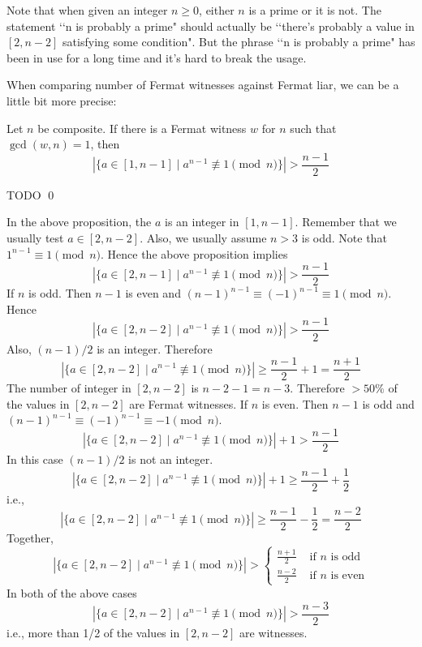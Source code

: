 Note that when given an integer $n \geq 0$, either $n$ is a prime
or it is not.
The statement \lq\lq n is probably a prime" should actually be
\lq\lq there's probably a value in $[2, n-2]$
satisfying some condition".
But the phrase \lq\lq n is probably a prime" has been in use for a long
time and it's hard to break the usage.

When comparing number of Fermat witnesses against Fermat liar,
we can be a little bit more precise:

\begin{prop}
  Let $n$ be composite.
  If there is a Fermat witness $w$ for $n$ such that $\gcd(w, n) = 1$, then
  \[
  |\{a \in [1, n - 1] \mid a^{n-1} \not\equiv 1 \pmod{n} \}| > \frac{n - 1}{2}
  \]
\end{prop}
\proof
TODO
\qed


In the above proposition, the $a$ is an integer in $[1, n - 1]$.
Remember that we usually test $a \in [2, n-2]$.
Also, we usually assume $n > 3$ is odd.
Note that $1^{n-1} \equiv 1 \pmod{n}$.
Hence the above proposition implies
\[
|\{a \in [2, n - 1] \mid a^{n-1} \not\equiv 1 \pmod{n} \}| > \frac{n - 1}{2}
\]
If $n$ is odd.
Then $n - 1$ is even and $(n-1)^{n-1} \equiv (-1)^{n-1} \equiv 1 \pmod{n}$.
Hence
\[
|\{a \in [2, n - 2] \mid a^{n-1} \not\equiv 1 \pmod{n} \}| > \frac{n - 1}{2}
\]
Also, $(n - 1)/2$ is an integer.
Therefore
\[
|\{a \in [2, n - 2] \mid a^{n-1} \not\equiv 1 \pmod{n} \}| \geq \frac{n - 1}{2}
+ 1 = \frac{n + 1}{2} 
\]
The number of integer in $[2, n - 2]$ is $n - 2 - 1 = n - 3$.
Therefore $>50\%$ of the values in $[2, n - 2]$ are Fermat witnesses.
If $n$ is even.
Then $n - 1$ is odd and $(n-1)^{n-1} \equiv (-1)^{n-1} \equiv -1 \pmod{n}$.
\[
|\{a \in [2, n - 2] \mid a^{n-1} \not\equiv 1 \pmod{n} \}| + 1 > \frac{n - 1}{2}
\]
In this case $(n - 1)/2$ is not an integer.
\[
|\{a \in [2, n - 2] \mid a^{n-1} \not\equiv 1 \pmod{n} \}| + 1
\geq \frac{n - 1}{2} + \frac{1}{2}
\]
i.e.,
\[
|\{a \in [2, n - 2] \mid a^{n-1} \not\equiv 1 \pmod{n} \}|
\geq \frac{n - 1}{2} - \frac{1}{2}
= \frac{n - 2}{2}
\]
Together,
\[
|\{a \in [2, n - 2] \mid a^{n-1} \not\equiv 1 \pmod{n} \}| >
\begin{cases}
  \displaystyle \frac{n + 1}{2} & \text{ if $n$ is odd} \\
  \displaystyle \frac{n - 2}{2} & \text{ if $n$ is even}
\end{cases}
\]
In both of the above cases
\[
|\{a \in [2, n - 2] \mid a^{n-1} \not\equiv 1 \pmod{n} \}| > \frac{n - 3}{2}
\]
i.e., more than 1/2 of the values in $[2, n - 2]$ are witnesses.

